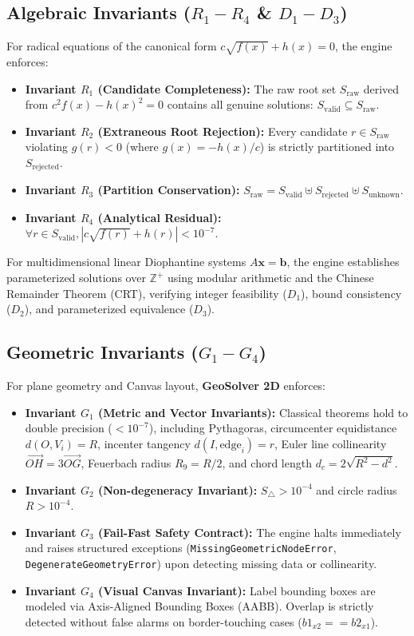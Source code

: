 \documentclass[conference]{IEEEtran}
\begin{document}
\subsection{Algebraic Invariants ($R_1 - R_4$ \& $D_1 - D_3$)}
For radical equations of the canonical form $c\sqrt{f(x)} + h(x) = 0$, the engine enforces:
\begin{itemize}
    \item \textbf{Invariant $R_1$ (Candidate Completeness):} The raw root set $S_{\text{raw}}$ derived from $c^2 f(x) - h(x)^2 = 0$ contains all genuine solutions: $S_{\text{valid}} \subseteq S_{\text{raw}}$.
    \item \textbf{Invariant $R_2$ (Extraneous Root Rejection):} Every candidate $r \in S_{\text{raw}}$ violating $g(r) < 0$ (where $g(x) = -h(x)/c$) is strictly partitioned into $S_{\text{rejected}}$.
    \item \textbf{Invariant $R_3$ (Partition Conservation):} $S_{\text{raw}} = S_{\text{valid}} \uplus S_{\text{rejected}} \uplus S_{\text{unknown}}$.
    \item \textbf{Invariant $R_4$ (Analytical Residual):} $\forall r \in S_{\text{valid}}, |c\sqrt{f(r)} + h(r)| < 10^{-7}$.
\end{itemize}
For multidimensional linear Diophantine systems $A\mathbf{x} = \mathbf{b}$, the engine establishes parameterized solutions over $\mathbb{Z}^+$ using modular arithmetic and the Chinese Remainder Theorem (CRT), verifying integer feasibility ($D_1$), bound consistency ($D_2$), and parameterized equivalence ($D_3$).

\subsection{Geometric Invariants ($G_1 - G_4$)}
For plane geometry and Canvas layout, \textbf{GeoSolver 2D} enforces:
\begin{itemize}
    \item \textbf{Invariant $G_1$ (Metric and Vector Invariants):} Classical theorems hold to double precision ($< 10^{-7}$), including Pythagoras, circumcenter equidistance $d(O, V_i) = R$, incenter tangency $d(I, \text{edge}_i) = r$, Euler line collinearity $\vec{OH} = 3\vec{OG}$, Feuerbach radius $R_9 = R/2$, and chord length $d_c = 2\sqrt{R^2 - d^2}$.
    \item \textbf{Invariant $G_2$ (Non-degeneracy Invariant):} $S_{\triangle} > 10^{-4}$ and circle radius $R > 10^{-4}$.
    \item \textbf{Invariant $G_3$ (Fail-Fast Safety Contract):} The engine halts immediately and raises structured exceptions (\texttt{MissingGeometricNodeError}, \texttt{DegenerateGeometryError}) upon detecting missing data or collinearity.
    \item \textbf{Invariant $G_4$ (Visual Canvas Invariant):} Label bounding boxes are modeled via Axis-Aligned Bounding Boxes (AABB). Overlap is strictly detected without false alarms on border-touching cases ($b1_{x2} == b2_{x1}$).
\end{itemize}
\end{document}
